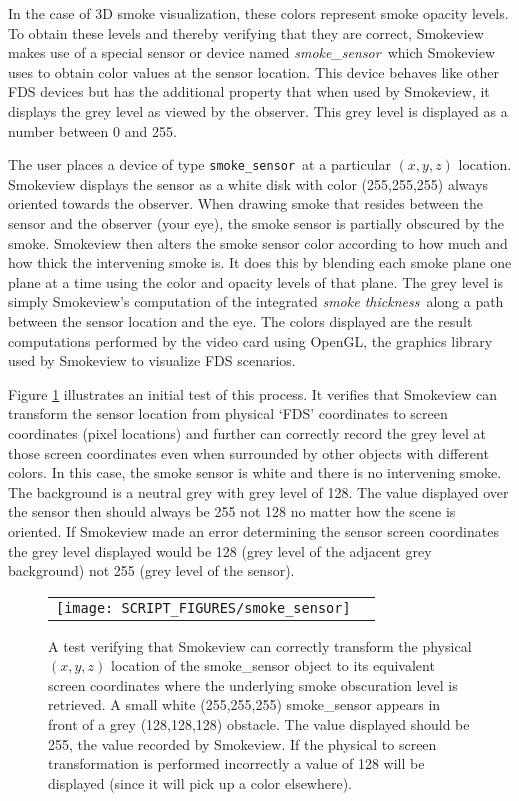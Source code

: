 \documentclass[11pt,twoside]{book}
\begin{document}
In the case of 3D smoke visualization, these colors represent smoke opacity levels.
To obtain these levels and thereby verifying that they are correct,
Smokeview makes use of a special sensor or device named {\em smoke\_sensor}\
which Smokeview uses to obtain color values at the sensor location.
This device behaves like other FDS devices but has the additional
property that when used by Smokeview, it displays the grey level as viewed by the observer.
This grey level is displayed as a number between 0 and 255.

The user places a device of type {\tt smoke\_sensor}\ at a particular $(x, y, z)$ location.
Smokeview displays the sensor as a white disk with color (255,255,255)
always oriented towards the observer. When drawing smoke that resides between
the sensor and the observer (your eye), the smoke sensor is partially obscured by the smoke.
Smokeview then alters the smoke sensor color according to how much and how thick the
intervening smoke is.  It does this by blending each smoke plane one plane at a time using
the color and opacity levels of that plane. The grey level is simply Smokeview's
computation of the integrated {\em smoke thickness}\ along a path between the sensor
location and the eye.  The colors displayed are the result computations performed by the
video card using OpenGL, the graphics library used by Smokeview to visualize FDS scenarios.

Figure \ref{figsmokesensor} illustrates an initial test of this process.
It verifies that Smokeview can transform the sensor location from physical
`FDS' coordinates to screen coordinates (pixel locations) and further
can correctly record the grey level at those screen coordinates even when
surrounded by other objects with different colors.
In this case, the smoke sensor is white and there is no intervening smoke.
The background is a neutral grey with grey level of 128.
The value displayed over the sensor then should always be 255 not 128 no matter
how the scene is oriented.
If Smokeview made an error determining the sensor screen coordinates the grey level
displayed would be 128 (grey level of the adjacent grey background) not 255
(grey level of the sensor).

\begin{figure}[\figoptions]
\begin{center}
 \centering
\begin{tabular}{cc}
\texttt{[image: SCRIPT\_FIGURES/smoke\_sensor]}&
 \end{tabular}
\end{center}
\caption[A test verifying that the Smokeview smoke\_sensor object is working properly]
{A test verifying that Smokeview can correctly transform the physical $(x,y,z)$
location of the smoke\_sensor object to its equivalent screen coordinates where
the underlying smoke obscuration level is retrieved. A small white (255,255,255)
smoke\_sensor appears in front of a grey (128,128,128) obstacle. The value displayed
should be 255,  the value recorded by Smokeview.  If the physical to screen
transformation is performed incorrectly a value of 128 will be displayed (since it
will pick up a color elsewhere).
}
\label{figsmokesensor}%
\end{figure}
\end{document}
